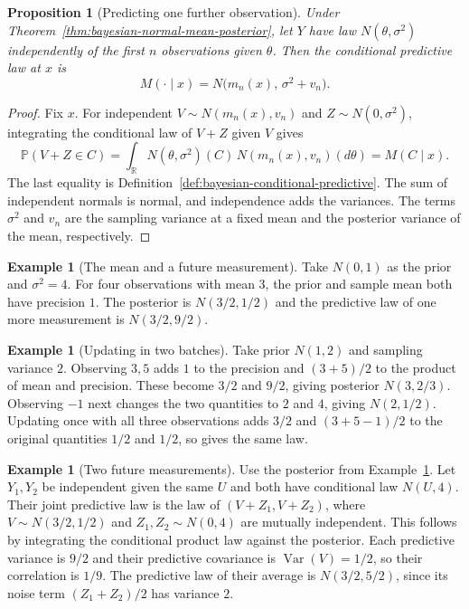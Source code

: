\documentclass[11pt,oneside]{book}
\newtheorem{proposition}[theorem]{Proposition}
\theoremstyle{definition}
\newtheorem{example}[theorem]{Example}
\theoremstyle{remark}
\newcommand{\R}{\mathbb R}
\begin{document}
\begin{proposition}[Predicting one further observation]
\label{prop:bayesian-normal-predictive}
Under Theorem~\ref{thm:bayesian-normal-mean-posterior}, let $Y$
have law $N(\theta,\sigma^2)$ independently of the first $n$
observations given $\theta$. Then the conditional predictive law
at $x$ is
\begin{equation}
M(\cdot\mid x)=N\bigl(m_n(x),\,\sigma^2+v_n\bigr).
\label{eq:bayesian-normal-predictive}
\end{equation}
\end{proposition}
\begin{proof}
Fix $x$. For independent $V\sim N(m_n(x),v_n)$ and
$Z\sim N(0,\sigma^2)$, integrating the conditional law of $V+Z$
given $V$ gives
\[
\mathbb P(V+Z\in C)
=\int_{\R}N(\theta,\sigma^2)(C)\,N(m_n(x),v_n)(d\theta)
=M(C\mid x).
\]
The last equality is Definition~\ref{def:bayesian-conditional-predictive}.
The sum of independent normals is normal, and independence adds
the variances. The terms $\sigma^2$ and $v_n$ are the sampling
variance at a fixed mean and the posterior variance of
the mean, respectively.
\end{proof}

\begin{example}[The mean and a future measurement]
\label{ex:bayesian-normal-mean-and-draw}
Take $N(0,1)$ as the prior and $\sigma^2=4$. For four observations
with mean $3$, the prior and sample mean both have precision $1$.
The posterior is $N(3/2,1/2)$ and the predictive law of one more
measurement is $N(3/2,9/2)$.
\end{example}

\begin{example}[Updating in two batches]
\label{ex:bayesian-normal-batches}
Take prior $N(1,2)$ and sampling variance $2$. Observing $3,5$
adds $1$ to the precision and $(3+5)/2$ to the product of mean
and precision. These become $3/2$ and $9/2$, giving posterior
$N(3,2/3)$. Observing $-1$ next changes the two quantities to
$2$ and $4$, giving $N(2,1/2)$. Updating once with all three
observations adds $3/2$ and $(3+5-1)/2$ to the original
quantities $1/2$ and $1/2$, so gives the same law.
\end{example}

\begin{example}[Two future measurements]
\label{ex:bayesian-normal-future-pair}
Use the posterior from Example~\ref{ex:bayesian-normal-mean-and-draw}.
Let $Y_1,Y_2$ be independent given the same $U$ and both have
conditional law $N(U,4)$. Their joint predictive law is the law of
$(V+Z_1,V+Z_2)$, where $V\sim N(3/2,1/2)$ and $Z_1,Z_2\sim N(0,4)$
are mutually independent. This follows by integrating the
conditional product law against the posterior. Each predictive
variance is $9/2$ and their predictive covariance is
$\operatorname{Var}(V)=1/2$, so their correlation is $1/9$.
The predictive law of their average is $N(3/2,5/2)$, since its
noise term $(Z_1+Z_2)/2$ has variance $2$.
\end{example}
\end{document}
